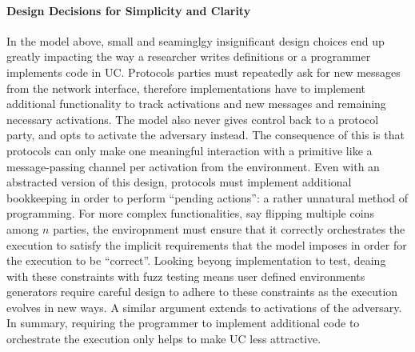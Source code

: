 
\paragraph{Design Decisions for Simplicity and Clarity}
In the model above, small and seaminglgy insignificant design choices end up
greatly impacting the way a researcher writes definitions or a programmer
implements code in UC.  Protocols parties must repeatedly ask for new messages
from the network interface, therefore implementations have to implement
additional functionality to track activations and new messages and remaining
necessary activations.  The model also never gives control back to a protocol
party, and opts to activate the adversary instead.  The consequence of this is
that protocols can only make one meaningful interaction with a primitive like a
message-passing channel per activation from the environment.  Even with an
abstracted version of this design, protocols must implement additional
bookkeeping in order to perform ``pending actions'': a rather unnatural method
of programming.  For more complex functionalities, say flipping multiple coins
among $n$ parties, the enviropnment must ensure that it correctly orchestrates
the execution to satisfy the implicit requirements that the model imposes in
order for the execution to be ``correct''.  Looking beyong implementation to
test, deaing with these constraints with fuzz testing means user defined
environments generators require careful design to adhere to these constraints
as the execution evolves in new ways.  A similar argument extends to
activations of the adversary.  In summary, requiring the programmer to
implement additional code to orchestrate the execution only helps to make UC
less attractive.


